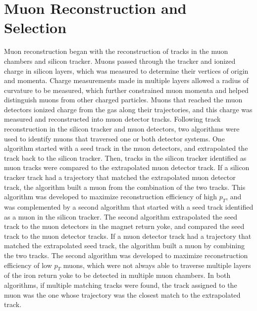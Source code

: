 \section{Muon Reconstruction and Selection}
\label{sec:muonRecoAndSelection}
Muon reconstruction began with the reconstruction of tracks in the muon chambers and silicon tracker.  
Muons passed through the tracker and ionized charge in silicon layers, which was measured to determine 
their vertices of origin and momenta.  Charge measurements made in multiple layers allowed a radius of 
curvature to be measured, which further constrained muon momenta and helped distinguish muons from other charged 
particles.  Muons that reached the muon detectors ionized charge from the gas along their trajectories, 
and this charge was measured and reconstructed into muon detector tracks.  Following track reconstruction 
in the silicon tracker and muon detectors, two algorithms \cite{cmsMuonRecoRunOne} were used to identify muons that traversed 
one or both detector systems.  One algorithm started with a seed track in the muon detectors, and 
extrapolated the track back to the silicon tracker.  Then, tracks in the silicon tracker identified as 
muon tracks were compared to the extrapolated muon detector track.  If a silicon tracker track had a 
trajectory that matched the extrapolated muon detector track, the algorithm built a muon from the 
combination of the two tracks.  This algorithm was developed to maximize reconstruction efficiency of 
high $p_{T}$, and was complemented by a second algorithm that started with a seed track identified as a 
muon in the silicon tracker.  The second algorithm extrapolated the seed track to the muon detectors in 
the magnet return yoke, and compared the seed track to the muon detector tracks.  If a muon detector track 
had a trajectory that matched the extrapolated seed track, the algorithm built a muon by combining the two 
tracks.  The second algorithm was developed to maximize reconstruction efficiency of low $p_{T}$ muons, which 
were not always able to traverse multiple layers of the iron return yoke to be detected in multiple 
muon chambers.  In both algorithms, if multiple matching tracks were found, the track assigned to the muon 
was the one whose trajectory was the closest match to the extrapolated track.

